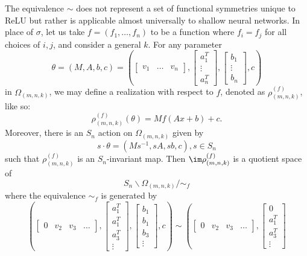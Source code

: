 \documentclass[11pt,letterpaper]{amsart}
\begin{document}
\begin{remark}\label{remark:generalizing}
    The equivalence $\sim$ does not represent a set of functional symmetries unique to ReLU but rather is applicable almost universally to shallow neural networks. In place of $\sigma$, let us take $f=(f_1, \ldots, f_n)$ to be a function where $f_i=f_j$ for all choices of $i, j$, and consider a general $k$. For any parameter
    $$
    \theta = (M, A, b, c) = \left(\begin{bmatrix}
        v_1 & \ldots & v_n
    \end{bmatrix}, \begin{bmatrix}
        a_1^T \\ \vdots \\ a_n^T
    \end{bmatrix}, \begin{bmatrix}
        b_1 \\ \vdots \\ b_n
    \end{bmatrix}, c\right)
    $$
    in $\Omega_{(m,n,k)}$, we may define a realization with respect to $f$, denoted as $\rho_{(m,n,k)}^{(f)}$, like so:
    $$
    \rho_{(m,n,k)}^{(f)}(\theta) = Mf(Ax+b)+c.
    $$
    Moreover, there is an $S_n$ action on $\Omega_{(m,n,k)}$ given by
    $$
    s\cdot \theta = (Ms^{-1}, sA, sb, c), s\in S_n
    $$
    such that $\rho_{(m,n,k)}^{(f)}$ is an $S_n$-invariant map. Then $\im\rho_{(m,n,k)}^{(f)}$ is a quotient space of 
    $$
    S_n\backslash \Omega_{(m,n,k)}/\sim_f
    $$
    where the equivalence $\sim_f$ is generated by
    $$
    \left(\begin{bmatrix}
        0 & v_2 & v_3 & \ldots
    \end{bmatrix}, \begin{bmatrix}
        a_1^T \\ a_1^T \\ a_3^T\\ \vdots
    \end{bmatrix}, \begin{bmatrix}
        b_1 \\ b_1 \\ b_3\\ \vdots
    \end{bmatrix}, c\right) \sim \left(\begin{bmatrix}
        0 & v_2 & v_3 & \ldots
    \end{bmatrix}, \begin{bmatrix}
        0 \\ a_1^T \\ a_3^T\\ \vdots

\end{bmatrix}$$
\end{remark}
\end{document}

